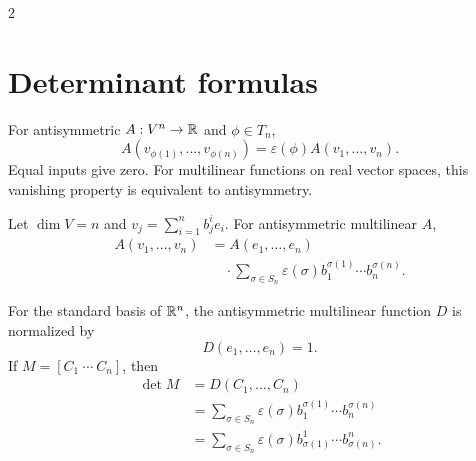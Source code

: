 \begin{fullwidth}
\begin{multicols}{2}
    \columnbreak
    \section{Determinant formulas}
    \label{sec:appendix:formula-sheet-determinants}

    For antisymmetric \(A:V^n\to\mathbb{R}\) and \(\phi\in T_n\),
    \[
      A(v_{\phi(1)},\ldots,v_{\phi(n)})
        =\varepsilon(\phi)A(v_1,\ldots,v_n).
    \]
    Equal inputs give zero. For multilinear functions on real vector
    spaces, this vanishing property is equivalent to antisymmetry.

    Let \(\dim V=n\) and \(v_j=\sum_{i=1}^n b^i_j e_i\). For
    antisymmetric multilinear \(A\),
    \[
      \begin{aligned}
        A(v_1,\ldots,v_n)
          &=A(e_1,\ldots,e_n)\\
          &\quad\cdot\sum_{\sigma\in S_n}\varepsilon(\sigma)
            b^{\sigma(1)}_1\cdots b^{\sigma(n)}_n.
      \end{aligned}
    \]

    For the standard basis of \(\mathbb{R}^n\), the antisymmetric multilinear
    function \(D\) is normalized by
    \[
      D(e_1,\ldots,e_n)=1.
    \]
    If \(M=[C_1\ \cdots\ C_n]\), then
    \[
      \begin{aligned}
        \det M&=D(C_1,\ldots,C_n)\\
          &=\sum_{\sigma\in S_n}\varepsilon(\sigma)
            b^{\sigma(1)}_1\cdots b^{\sigma(n)}_n\\
          &=\sum_{\sigma\in S_n}\varepsilon(\sigma)
            b^1_{\sigma(1)}\cdots b^n_{\sigma(n)}.
      \end{aligned}
    \]
  \end{multicols}
\end{fullwidth}
\clearpage
